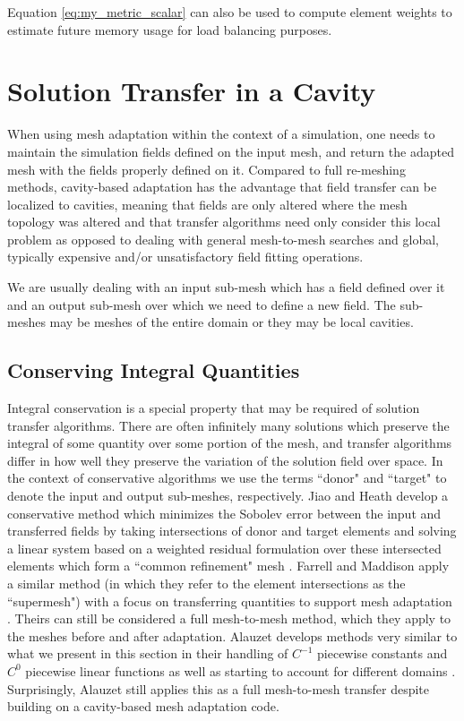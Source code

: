 Equation \ref{eq:my_metric_scalar} can also be used to compute element weights
to estimate future memory usage for load balancing purposes.

\section{Solution Transfer in a Cavity}

When using mesh adaptation within the context of a simulation,
one needs to maintain the simulation fields defined on the input mesh,
and return the adapted mesh with the fields properly defined on it.
Compared to full re-meshing methods, cavity-based adaptation has the
advantage that field transfer can be localized to cavities, meaning
that fields are only altered where the mesh topology was altered and
that transfer algorithms need only consider this local problem
as opposed to dealing with general mesh-to-mesh searches and
global, typically expensive and/or unsatisfactory field fitting operations.

We are usually dealing with an input sub-mesh which has a field defined
over it and an output sub-mesh over which we need to define a new
field.
The sub-meshes may be meshes of the entire domain or they may
be local cavities.

\subsection{Conserving Integral Quantities}

Integral conservation is a special property that may be required of
solution transfer algorithms.
There are often infinitely many solutions which preserve the
integral of some quantity over some portion of the mesh, and
transfer algorithms differ in how well they preserve the variation
of the solution field over space.
In the context of conservative algorithms we use the terms
``donor" and ``target" to denote the input and output sub-meshes,
respectively.
Jiao and Heath develop a conservative method which minimizes
the Sobolev error between the input and transferred fields
by taking intersections of donor and target elements and
solving a linear system based on a weighted residual formulation
over these intersected elements which form a ``common refinement" mesh
\cite{jiao2004common}.
Farrell and Maddison apply a similar method (in which they refer
to the element intersections as the ``supermesh") with a focus
on transferring quantities to support mesh adaptation \cite{farrell2009conservative}.
Theirs can still be considered a full mesh-to-mesh method, which
they apply to the meshes before and after adaptation.
Alauzet develops methods very similar to what we present in this
section in their handling of $C^{-1}$
piecewise constants and $C^0$ piecewise linear functions as well
as starting to account for different domains \cite{alauzet2016parallel}.
Surprisingly, Alauzet still applies this as a full mesh-to-mesh transfer
despite building on a cavity-based mesh adaptation code.

